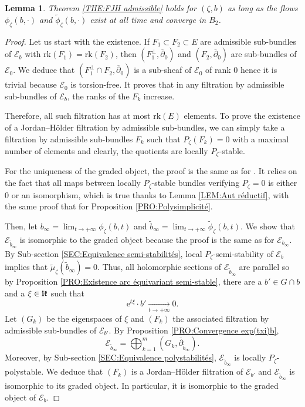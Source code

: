 \documentclass{article}
\newtheorem{lemma}[theorem]{Lemma}
\theoremstyle{remark}
\theoremstyle{definition}
\newcommand{\tend}[2]{\underset{#1 \rightarrow #2}{\longrightarrow}}
\newcommand{\rk}{\mathrm{rk}}
\renewcommand{\i}{\boldsymbol{\mathrm{i}}}
\newcommand{\e}{\boldsymbol{\mathrm{e}}}
\newcommand{\E}{\mathcal{E}}
\newcommand{\dbar}{\overline{\partial}}
\begin{document}
\begin{lemma}\label{LEM:FJH admissible}
    Theorem \ref{THE:FJH admissible} holds for $(\zeta,b)$ as long as the flows $\phi_\zeta(b,\cdot)$ and $\tilde{\phi}_\zeta(b,\cdot)$ exist at all time and converge in $B_2$.
\end{lemma}
\begin{proof}
Let us start with the existence. If $F_1 \subset F_2 \subset E$ are admissible sub-bundles of $\E_b$ with $\rk(F_1) = \rk(F_2)$, then $(F_1^\bot,\dbar_0)$ and $(F_2,\dbar_0)$ are sub-bundles of $\E_0$. We deduce that $(F_1^\bot \cap F_2,\dbar_0)$ is a sub-sheaf of $\E_0$ of rank $0$ hence it is trivial because $\E_0$ is torsion-free. It proves that in any filtration by admissible sub-bundles of $\E_b$, the ranks of the $F_k$ increase.

Therefore, all such filtration has at most $\rk(E)$ elements. To prove the existence of a Jordan--Hölder filtration by admissible sub-bundles, we can simply take a filtration by admissible sub-bundles $F_k$ such that $P_\zeta(F_k) = 0$ with a maximal number of elements and clearly, the quotients are locally $P_\zeta$-stable.

For the uniqueness of the graded object, the proof is the same as for \cite[Proposition 1.5.2]{Huybrechts_Lehn}. It relies on the fact that all maps between locally $P_\zeta$-stable bundles verifying $P_\zeta = 0$ is either $0$ or an isomorphism, which is true thanks to Lemma \ref{LEM:Aut réductif}, with the same proof that for Proposition \ref{PRO:Polysimplicité}.

Then, let $b_\infty = \lim_{t \rightarrow +\infty} \phi_\zeta(b,t)$ and $\tilde{b}_\infty = \lim_{t \rightarrow +\infty} \tilde{\phi}_\zeta(b,t)$. We show that $\E_{\tilde{b}_\infty}$ is isomorphic to the graded object because the proof is the same as for $\E_{b_\infty}$. By Sub-section \ref{SEC:Equivalence semi-stabilités}, local $P_\zeta$-semi-stability of $\E_b$ implies that $\tilde{\mu}_\zeta(\tilde{b}_\infty) = 0$. Thus, all holomorphic sections of $\E_{\tilde{b}_\infty}$ are parallel so by Proposition \ref{PRO:Existence arc équivariant semi-stable}, there are a $b' \in G \cap b$ and a $\xi \in \i\frak{k}$ such that
$$
\e^{t\xi} \cdot b' \tend{t}{+\infty} 0.
$$
Let $(G_k)$ be the eigenspaces of $\xi$ and $(F_k)$ the associated filtration by admissible sub-bundles of $\E_{b'}$. By Proposition \ref{PRO:Convergence exp(txi)b},
$$
\E_{\tilde{b}_\infty} = \bigoplus_{k = 1}^m (G_k,\dbar_{\tilde{b}_\infty}).
$$
Moreover, by Sub-section \ref{SEC:Equivalence polystabilités}, $\E_{\tilde{b}_\infty}$ is locally $P_\zeta$-polystable. We deduce that $(F_k)$ is a Jordan--Hölder filtration of $\E_{b'}$ and $\E_{\tilde{b}_\infty}$ is isomorphic to its graded object. In particular, it is isomorphic to the graded object of $\E_b$.
\end{proof}
\end{document}
